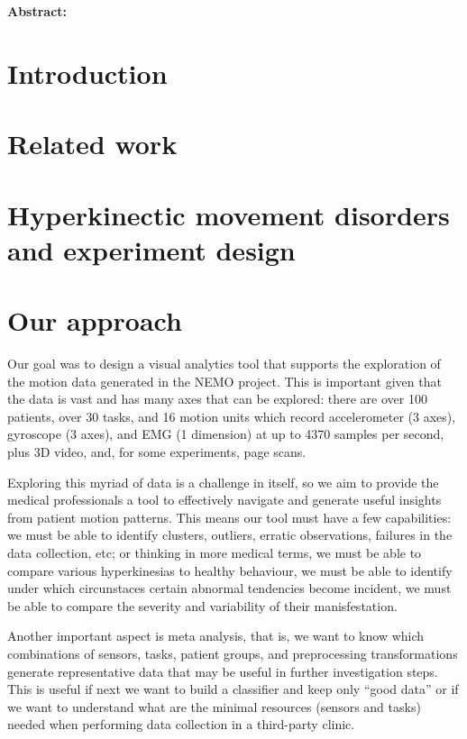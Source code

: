 
\noindent \textbf{Abstract:}

\section{Introduction}

\section{Related work}

\section{Hyperkinectic movement disorders and experiment design}

\section{Our approach}

Our goal was to design a visual analytics tool that supports the exploration of the motion data generated in the NEMO project. This is important given that the data is vast and has many axes that can be explored: there are over 100 patients, over 30 tasks, and 16 motion units which record accelerometer (3 axes), gyroscope (3 axes), and EMG (1 dimension) at up to 4370 samples per second, plus 3D video, and, for some experiments, page scans. 

Exploring this myriad of data is a challenge in itself, so we aim to provide the medical professionals a tool to effectively navigate and generate useful insights from patient motion patterns. This means our tool must have a few capabilities: we must be able to identify clusters, outliers, erratic observations, failures in the data collection, etc; or thinking in more medical terms, we must be able to compare various hyperkinesias to healthy behaviour, we must be able to identify under which circunstaces certain abnormal tendencies become incident, we must be able to compare the severity and variability of their manisfestation.

Another important aspect is meta analysis, that is, we want to know which combinations of sensors, tasks, patient groups, and preprocessing transformations generate representative data that may be useful in further investigation steps. This is useful if next we want to build a classifier and keep only ``good data'' or if we want to understand what are the minimal resources (sensors and tasks) needed when performing data collection in a third-party clinic.

